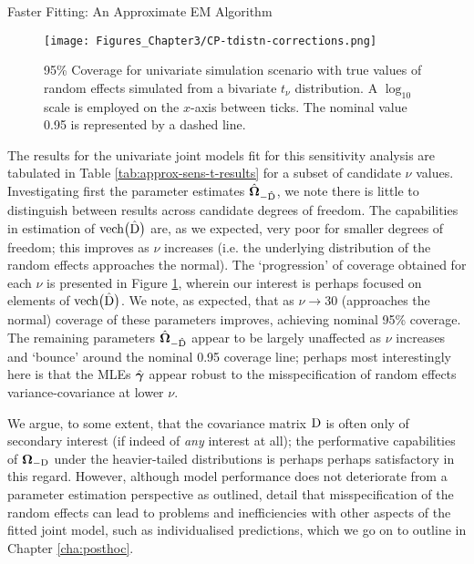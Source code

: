 \begin{chapter}{\label{cha:approx}Faster Fitting: An Approximate EM Algorithm}
  \begin{figure}[t]
      \centering
      \texttt{[image: Figures\_Chapter3/CP-tdistn-corrections.png]}
      \caption{95\% Coverage for univariate simulation scenario with true values of random effects simulated from a bivariate $t_\nu$ distribution. A $\log_{10}$ scale is employed on the $x$-axis between ticks. The nominal value 0.95 is represented by a dashed line.}
      \label{fig:approx-sens-t-CP}
  \end{figure}
  
  The results for the univariate joint models fit for this sensitivity analysis are tabulated in Table \ref{tab:approx-sens-t-results} for a subset of candidate $\nu$ values. Investigating first the parameter estimates $\hat{\bm{\Omega}}_{-\hat{\mathrm{D}}}$, we note there is little to distinguish between results across candidate degrees of freedom. The capabilities in estimation of $\text{vech}\big(\hat{\mathrm{D}}\big)$ are, as we expected, very poor for smaller degrees of freedom; this improves as $\nu$ increases (i.e. the underlying distribution of the random effects approaches the normal). The `progression' of coverage obtained for each $\nu$ is presented in Figure \ref{fig:approx-sens-t-CP}, wherein our interest is perhaps focused on elements of $\text{vech}\big(\hat{\mathrm{D}}\big)$. We note, as expected, that as $\nu\rightarrow30$ (\ie approaches the normal) coverage of these parameters improves, achieving nominal 95\% coverage. The remaining parameters $\hat{\bm{\Omega}}_{-\hat{\mathrm{D}}}$ appear to be largely unaffected as $\nu$ increases and `bounce' around the nominal 0.95 coverage line; perhaps most interestingly here is that the MLEs $\hat{\bm{\gamma}}$ appear robust to the misspecification of random effects variance-covariance at lower $\nu$. 
  
  We argue, to some extent, that the covariance matrix $\mathrm{D}$ is often only of secondary interest (if indeed of \textit{any} interest at all); the performative capabilities of $\bm{\mathrm{\Omega}}_{-\mathrm{D}}$ under the heavier-tailed distributions is perhaps perhaps satisfactory in this regard. However, although model performance does not deteriorate from a parameter estimation perspective as outlined, \citet{McFetridge2021} detail that misspecification of the random effects can lead to problems and inefficiencies with other aspects of the fitted joint model, such as individualised predictions, which we go on to outline in Chapter \ref{cha:posthoc}.


\end{chapter}
